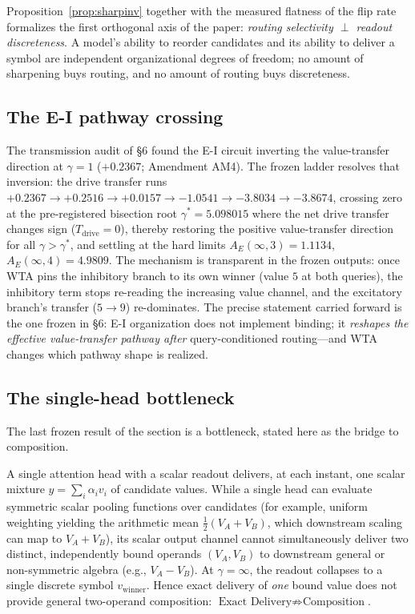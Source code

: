 Proposition~\ref{prop:sharpinv} together with the measured flatness of the
flip rate formalizes the first orthogonal axis of the paper:
\emph{routing selectivity $\perp$ readout discreteness}. A model's ability
to reorder candidates and its ability to deliver a symbol are independent
organizational degrees of freedom; no amount of sharpening buys routing,
and no amount of routing buys discreteness.

\subsection{The E-I pathway crossing}
\label{sec:pathway}

The transmission audit of §6 found the E-I circuit inverting the
value-transfer direction at $\gamma=1$ ($+0.2367$; Amendment AM4). The
frozen ladder resolves that inversion: the drive transfer runs
$+0.2367\to+0.2516\to+0.0157\to-1.0541\to-3.8034\to-3.8674$, crossing zero
at the pre-registered bisection root $\gamma^*=5.098015$ where the net drive transfer
changes sign ($T_{\mathrm{drive}}=0$), thereby restoring the positive value-transfer
direction for all $\gamma > \gamma^*$, and settling at
the hard limits $A_E(\infty,3)=1.1134$, $A_E(\infty,4)=4.9809$. The
mechanism is transparent in the frozen outputs: once WTA pins the
inhibitory branch to its own winner (value $5$ at both queries), the
inhibitory term stops re-reading the increasing value channel, and the
excitatory branch's transfer ($5\to9$) re-dominates. The precise statement
carried forward is the one frozen in §6: E-I organization does not
implement binding; it \emph{reshapes the effective value-transfer pathway
after} query-conditioned routing---and WTA changes which pathway shape is
realized.

\subsection{The single-head bottleneck}
\label{sec:bottleneck}

The last frozen result of the section is a bottleneck, stated here as the
bridge to composition.

\begin{proposition}
\label{prop:singlehead}
A single attention head with a scalar readout delivers, at each instant, one scalar mixture
$y = \sum_i \alpha_i v_i$ of candidate values. While a single head can evaluate symmetric
scalar pooling functions over candidates (for example, uniform weighting yielding the arithmetic
mean $\frac{1}{2}(V_A+V_B)$, which downstream scaling can map to $V_A+V_B$), its scalar output
channel cannot simultaneously deliver two distinct, independently bound operands $(V_A, V_B)$
to downstream general or non-symmetric algebra (e.g., $V_A - V_B$). At $\gamma=\infty$, the readout
collapses to a single discrete symbol $v_{\mathrm{winner}}$. Hence exact delivery of \emph{one}
bound value does not provide general two-operand composition: $\text{Exact Delivery}\not\Rightarrow
\text{Composition}$.
\end{proposition}

